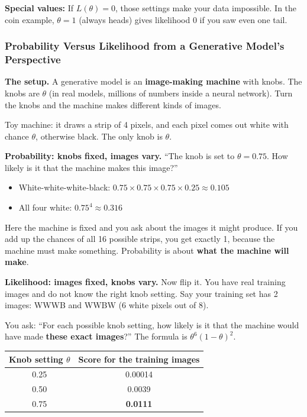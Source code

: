 \textbf{Special values:} If $L(\theta) = 0$, those settings make your data impossible. In the coin example, $\theta = 1$ (always heads) gives likelihood 0 if you saw even one tail.

\subsubsection*{Probability Versus Likelihood from a Generative Model's Perspective}

\textbf{The setup.} A generative model is an \textbf{image-making machine} with knobs. The knobs are $\theta$ (in real models, millions of numbers inside a neural network). Turn the knobs and the machine makes different kinds of images.

Toy machine: it draws a strip of 4 pixels, and each pixel comes out white with chance $\theta$, otherwise black. The only knob is $\theta$.

\textbf{Probability: knobs fixed, images vary.} ``The knob is set to $\theta = 0.75$. How likely is it that the machine makes this image?''
\begin{itemize}
  \item White-white-white-black: $0.75 \times 0.75 \times 0.75 \times 0.25 \approx 0.105$
  \item All four white: $0.75^{4} \approx 0.316$
\end{itemize}

Here the machine is fixed and you ask about the images it might produce. If you add up the chances of all 16 possible strips, you get exactly 1, because the machine must make something. Probability is about \textbf{what the machine will make}.

\textbf{Likelihood: images fixed, knobs vary.} Now flip it. You have real training images and do not know the right knob setting. Say your training set has 2 images: WWWB and WWBW (6 white pixels out of 8).

You ask: ``For each possible knob setting, how likely is it that the machine would have made \textbf{these exact images}?'' The formula is $\theta^{6}(1 - \theta)^{2}$.

\begin{tabular}{@{}cc@{}}
\toprule
Knob setting $\theta$ & Score for the training images \\
\midrule
0.25 & 0.00014 \\
0.50 & 0.0039 \\
0.75 & \textbf{0.0111} \\
\bottomrule
\end{tabular}

